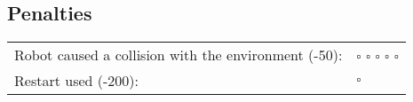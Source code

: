 \begin{flushleft}

\subsection*{Penalties}
\begin{tabular}{ l l}
	Robot caused a collision with the environment (-50): & $\square$ $\square$ $\square$ $\square$ $\square$ \\
	Restart used (-200): & $\square$ \\
\end{tabular}
\end{flushleft}
